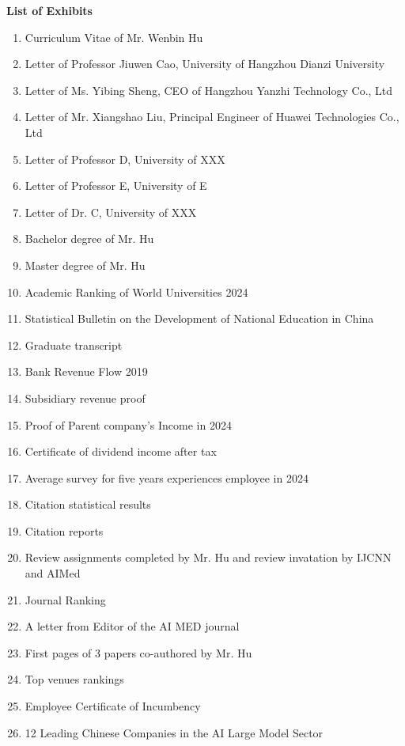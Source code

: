 \documentclass{article}
\begin{document}
\clearpage

{\bf List of Exhibits}
\label{exhib}

\begin{enumerate}[label={Exhibit \arabic*:}]
    \item Curriculum Vitae of Mr. Wenbin Hu
    \item Letter of Professor Jiuwen Cao, University of Hangzhou Dianzi University
    \item Letter of Ms. Yibing Sheng, CEO of Hangzhou Yanzhi Technology Co., Ltd
    \item Letter of Mr. Xiangshao Liu, Principal Engineer of Huawei Technologies Co., Ltd
    \item Letter of Professor D, University of XXX
    \item Letter of Professor E, University of E 
    \item Letter of Dr. C, University of XXX
    \item Bachelor degree of Mr. Hu 
    \item Master degree of Mr. Hu 
    \item Academic Ranking of World Universities 2024
    \item Statistical Bulletin on the Development of National Education in China
    \item Graduate transcript
    \item Bank Revenue Flow 2019
    \item Subsidiary revenue proof
    \item Proof of Parent company's Income in 2024
    \item Certificate of dividend income after tax
    \item Average survey for five years experiences employee in 2024
    \item Citation statistical results
    \item Citation reports
    \item Review assignments completed by Mr. Hu and review invatation by IJCNN and AIMed
    \item Journal Ranking
    \item A letter from Editor of the AI MED journal
    \item First pages of 3 papers co-authored by Mr. Hu
    \item Top venues rankings
    \item Employee Certificate of Incumbency
    \item 12 Leading Chinese Companies in the AI Large Model Sector

\end{enumerate}
\end{document}
